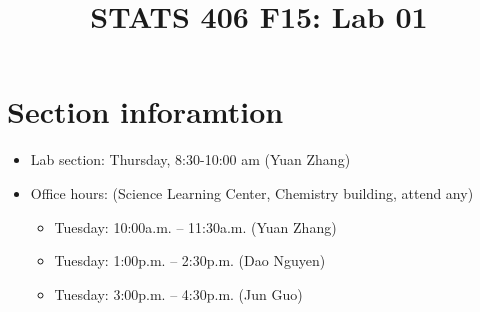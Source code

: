 \documentclass[10pt]{article}
\begin{document}
\title{\Large \bf STATS 406 F15: Lab 01}
\date{}

\maketitle
\section{Section inforamtion}
\begin{itemize}
	
	\item Lab section: Thursday, 8:30-10:00 am  (Yuan Zhang)
	\item Office hours: (Science Learning Center, Chemistry building, attend any)
	\begin{itemize}
	\item Tuesday: 10:00a.m. -- 11:30a.m. (Yuan Zhang)
	\item Tuesday: 1:00p.m. -- 2:30p.m. (Dao Nguyen)
	\item Tuesday: 3:00p.m. -- 4:30p.m.  (Jun Guo)
	\end{itemize}
 \end{itemize}
\end{document}
